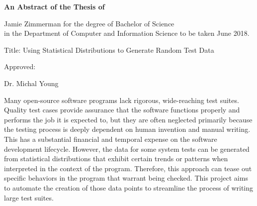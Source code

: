 
\begin{center}

\normalsize \textbf {An Abstract of the Thesis of}

Jamie Zimmerman for the degree of Bachelor of Science \\
in the Department of Computer and Information Science to be taken June 2018.

\vspace{2cm}


Title: Using Statistical Distributions to Generate Random Test Data

\vspace{1.5cm}

Approved: \hrulefill

Dr. Michal Young

\vspace{1cm}

\end{center}
\setlength{\parindent}{0.5cm}
\indent\indent Many open-source software programs lack rigorous, wide-reaching test suites. Quality test cases provide assurance that the software functions properly and performs the job it is expected to, but they are often neglected primarily because the testing process is deeply dependent on human invention and manual writing. This has a substantial financial and temporal expense on the software development lifecycle. However, the data for some system tests can be generated from statistical distributions that exhibit certain trends or patterns when interpreted in the context of the program. Therefore, this approach can tease out specific behaviors in the program that warrant being checked. This project aims to automate the creation of those data points to streamline the process of writing large test suites.
